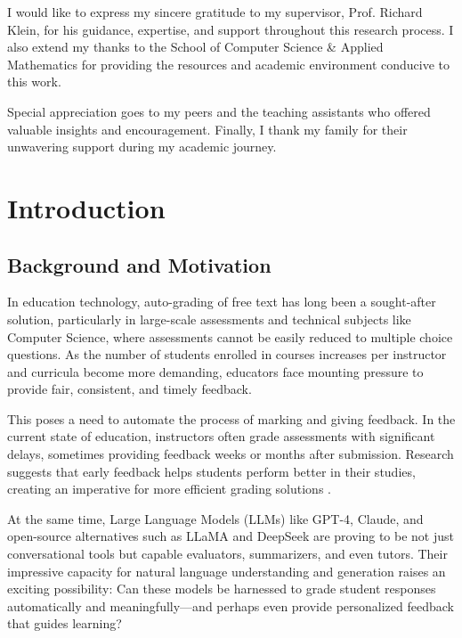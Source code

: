 \begin{acknowledgements}
I would like to express my sincere gratitude to my supervisor, Prof. Richard Klein, for his guidance, expertise, and support throughout this research process. I also extend my thanks to the School of Computer Science \& Applied Mathematics for providing the resources and academic environment conducive to this work.

Special appreciation goes to my peers and the teaching assistants who offered valuable insights and encouragement. Finally, I thank my family for their unwavering support during my academic journey.
\end{acknowledgements}

{}
\tableofcontents
\newpage
{}
{}
\listoffigures
\newpage
{}
{}
\listoftables
\newpage
{}

\chapter{Introduction}

\section{Background and Motivation}
In education technology, auto-grading of free text has long been a sought-after solution, particularly in large-scale assessments and technical subjects like Computer Science, where assessments cannot be easily reduced to multiple choice questions. As the number of students enrolled in courses increases per instructor and curricula become more demanding, educators face mounting pressure to provide fair, consistent, and timely feedback.

This poses a need to automate the process of marking and giving feedback. In the current state of education, instructors often grade assessments with significant delays, sometimes providing feedback weeks or months after submission. Research suggests that early feedback helps students perform better in their studies, creating an imperative for more efficient grading solutions \citep{shute2008focus}.

At the same time, Large Language Models (LLMs) like GPT-4, Claude, and open-source alternatives such as LLaMA and DeepSeek are proving to be not just conversational tools but capable evaluators, summarizers, and even tutors. Their impressive capacity for natural language understanding and generation raises an exciting possibility: Can these models be harnessed to grade student responses automatically and meaningfully—and perhaps even provide personalized feedback that guides learning?


